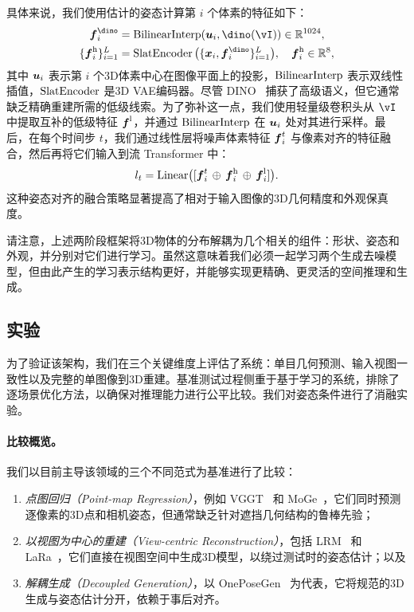 \documentclass[../../book-main_zh.tex]{subfiles}
\begin{document}
具体来说，我们使用估计的姿态计算第 $i$ 个体素的特征如下：
\begin{equation}
\begin{aligned}
\feat^\dino_{i} &= \interp(\pixcoord_i, \dino(\image)) \in \mathbb{R}^{1024}, \\
\{\feat^{\high}_{i}\}_{i=1}^{\numpts} &= \slatenc\big(\{\point_i, \feat^\dino_i\}_{i=1}^{\numpts}\big), \quad \feat^{\high}_{i} \in \mathbb{R}^{8},
\end{aligned}
\label{eq:latent}
\end{equation}
其中 $\boldsymbol{u}_i$ 表示第 $i$ 个3D体素中心在图像平面上的投影，$\operatorname{BilinearInterp}$ 表示双线性插值，$\operatorname{SlatEncoder}$ 是3D VAE编码器。尽管 DINO~\citep{oquab2023dinov2} 捕获了高级语义，但它通常缺乏精确重建所需的低级线索。为了弥补这一点，我们使用轻量级卷积头从 $\image$ 中提取互补的低级特征 $\boldsymbol{f}^{\mathrm{l}}$，并通过 $\operatorname{BilinearInterp}$ 在 $\boldsymbol{u}_i$ 处对其进行采样。最后，在每个时间步 $t$，我们通过线性层将噪声体素特征 $\boldsymbol{f}_i^{t}$ 与像素对齐的特征融合，然后再将它们输入到流 Transformer 中：
\begin{equation}
l_t = \mathrm{Linear}\big([\boldsymbol{f}_i^{t}\,\oplus\, \boldsymbol{f}^{\mathrm{h}}_{i} \,\oplus\, \boldsymbol{f}^{\mathrm{l}}_{i}]\big).
\end{equation}
这种姿态对齐的融合策略显著提高了相对于输入图像的3D几何精度和外观保真度。

\begin{remark}[解耦的生成过程]
请注意，上述两阶段框架将3D物体的分布解耦为几个相关的组件：形状、姿态和外观，并分别对它们进行学习。虽然这意味着我们必须一起学习两个生成去噪模型，但由此产生的学习表示结构更好，并能够实现更精确、更灵活的空间推理和生成。
\end{remark}

\subsection{实验}
\label{sec:experiments}
\label{sec:Evaluation}

为了验证该架构，我们在三个关键维度上评估了系统：单目几何预测、输入视图一致性以及完整的单图像到3D重建。基准测试过程侧重于基于学习的系统，排除了逐场景优化方法，以确保对推理能力进行公平比较。我们对姿态条件进行了消融实验。

\paragraph{比较概览。}
我们以目前主导该领域的三个不同范式为基准进行了比较：
\begin{enumerate}[label=(\roman*)]
    \item \textit{点图回归（Point-map Regression）}，例如 VGGT~\citep{wang2025vggt} 和 MoGe~\citep{wang2025moge}，它们同时预测逐像素的3D点和相机姿态，但通常缺乏针对遮挡几何结构的鲁棒先验；
    \item \textit{以视图为中心的重建（View-centric Reconstruction）}，包括 LRM~\citep{hong2023lrm} 和 LaRa~\citep{LaRa}，它们直接在视图空间中生成3D模型，以绕过测试时的姿态估计；以及
    \item \textit{解耦生成（Decoupled Generation）}，以 OnePoseGen~\citep{geng2025one} 为代表，它将规范的3D生成与姿态估计分开，依赖于事后对齐。
\end{enumerate}
\end{document}

